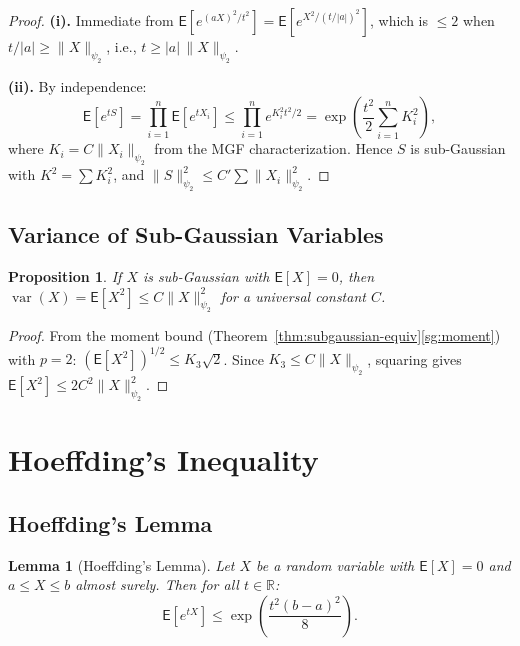 \documentclass[14pt]{extarticle}
\theoremstyle{plain}
\newtheorem{lemma}[theorem]{Lemma}
\newtheorem{proposition}[theorem]{Proposition}
\theoremstyle{definition}
\theoremstyle{remark}
\newcommand\expc{\mathsf{E}}
\DeclareMathOperator\var{var}
\newcommand{\Real}{\mathbb{R}}
\begin{document}
\begin{proof}
\textbf{(i).} Immediate from $\expc[e^{(aX)^2/t^2}] = \expc[e^{X^2/(t/|a|)^2}]$, which is $\leqslant 2$ when $t/|a| \geqslant \|X\|_{\psi_2}$, i.e., $t \geqslant |a|\,\|X\|_{\psi_2}$.

\textbf{(ii).} By independence:
\[
\expc\!\left[e^{tS}\right] = \prod_{i=1}^n \expc\!\left[e^{tX_i}\right] \leqslant \prod_{i=1}^n e^{K_i^2 t^2/2} = \exp\!\left(\frac{t^2}{2}\sum_{i=1}^n K_i^2\right),
\]
where $K_i = C\|X_i\|_{\psi_2}$ from the MGF characterization. Hence $S$ is sub-Gaussian with $K^2 = \sum K_i^2$, and $\|S\|_{\psi_2}^2 \leqslant C'\sum\|X_i\|_{\psi_2}^2$.
\end{proof}

\subsection{Variance of Sub-Gaussian Variables}

\begin{proposition}\label{prop:sg-variance}
If $X$ is sub-Gaussian with $\expc[X] = 0$, then $\var(X) = \expc[X^2] \leqslant C\|X\|_{\psi_2}^2$ for a universal constant $C$.
\end{proposition}

\begin{proof}
From the moment bound (Theorem~\ref{thm:subgaussian-equiv}\ref{sg:moment}) with $p = 2$: $(\expc[X^2])^{1/2} \leqslant K_3\sqrt{2}$. Since $K_3 \leqslant C\|X\|_{\psi_2}$, squaring gives $\expc[X^2] \leqslant 2C^2\|X\|_{\psi_2}^2$.
\end{proof}

\section{Hoeffding's Inequality}\label{sec:hoeffding}

\subsection{Hoeffding's Lemma}

\begin{lemma}[Hoeffding's Lemma]\label{lem:hoeffding-lemma}
Let $X$ be a random variable with $\expc[X] = 0$ and $a \leqslant X \leqslant b$ almost surely. Then for all $t \in \Real$:
\begin{equation}\label{eq:hoeffding-lemma}
\expc[e^{tX}] \leqslant \exp\!\left(\frac{t^2(b-a)^2}{8}\right).
\end{equation}
\end{lemma}
\end{document}
